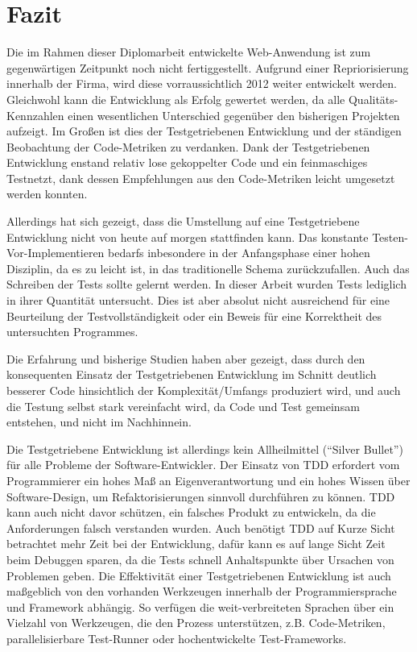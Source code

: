 \chapter{Fazit}

Die im Rahmen dieser Diplomarbeit entwickelte Web-Anwendung ist zum gegenwärtigen Zeitpunkt noch nicht fertiggestellt. Aufgrund einer Repriorisierung innerhalb der Firma, wird diese vorraussichtlich 2012 weiter entwickelt werden. Gleichwohl kann die Entwicklung als Erfolg gewertet werden, da alle Qualitäts-Kennzahlen einen wesentlichen Unterschied gegenüber den bisherigen Projekten aufzeigt. Im Großen ist dies der Testgetriebenen Entwicklung und der ständigen Beobachtung der Code-Metriken zu verdanken. Dank der Testgetriebenen Entwicklung enstand relativ lose gekoppelter Code und ein feinmaschiges Testnetzt, dank dessen Empfehlungen aus den Code-Metriken leicht umgesetzt werden konnten.

Allerdings hat sich gezeigt, dass die Umstellung auf eine Testgetriebene Entwicklung nicht von heute auf morgen stattfinden kann. Das 
konstante Testen-Vor-Implementieren bedarfs inbesondere in der Anfangsphase einer hohen Disziplin, da es zu leicht ist, in das traditionelle Schema zurückzufallen. Auch das Schreiben der Tests sollte gelernt werden. In dieser Arbeit wurden Tests lediglich in ihrer Quantität untersucht. Dies ist aber absolut nicht ausreichend für eine Beurteilung der Testvollständigkeit oder ein Beweis für eine Korrektheit des untersuchten Programmes. 

Die Erfahrung und bisherige Studien haben aber gezeigt, dass durch den konsequenten Einsatz der Testgetriebenen Entwicklung im Schnitt deutlich besserer Code hinsichtlich der Komplexität/Umfangs produziert wird, und auch die Testung selbst stark vereinfacht wird, da Code und Test gemeinsam entstehen, und nicht im Nachhinnein.

Die Testgetriebene Entwicklung ist allerdings kein Allheilmittel ("`Silver Bullet"') für alle Probleme der Software-Entwickler. Der Einsatz von TDD erfordert vom Programmierer ein hohes Maß an Eigenverantwortung und ein hohes Wissen über Software-Design, um Refaktorisierungen sinnvoll durchführen zu können. TDD kann auch nicht davor schützen, ein falsches Produkt zu entwickeln, da die Anforderungen falsch verstanden wurden. Auch benötigt TDD auf Kurze Sicht betrachtet mehr Zeit bei der Entwicklung, dafür kann es auf lange Sicht Zeit beim Debuggen sparen, da die Tests schnell Anhaltspunkte über Ursachen von Problemen geben.
Die Effektivität einer Testgetriebenen Entwicklung ist auch maßgeblich von den vorhanden Werkzeugen innerhalb der Programmiersprache und Framework abhängig. So verfügen die weit-verbreiteten Sprachen über ein Vielzahl von Werkzeugen, die den Prozess unterstützen, z.B. Code-Metriken, parallelisierbare Test-Runner oder hochentwickelte Test-Frameworks.

